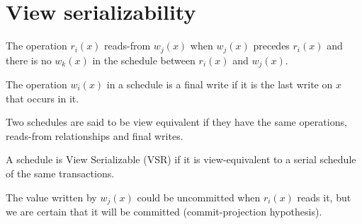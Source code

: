 \section{View serializability}

\begin{definition}
    The operation $r_i(x)$ reads-from $w_j(x)$ when $w_j(x)$ precedes $r_i(x)$ and there is no $w_k(x)$ in the schedule between $r_i(x)$ and $w_j(x)$. 
\end{definition}   
\begin{definition}
    The operation $w_i(x)$ in a schedule is a final write if it is the last write on $x$ that occurs in it. 
\end{definition}
\begin{definition}
    Two schedules are said to be view equivalent if they have the same operations, reads-from relationships and final writes.
\end{definition}
\begin{definition}
    A schedule is View Serializable (VSR) if it is view-equivalent to a serial schedule of the same transactions. 
\end{definition}
The value written by $w_j(x)$ could be uncommitted when $r_i(x)$ reads it, but we are certain that it will be committed (commit-projection hypothesis).

